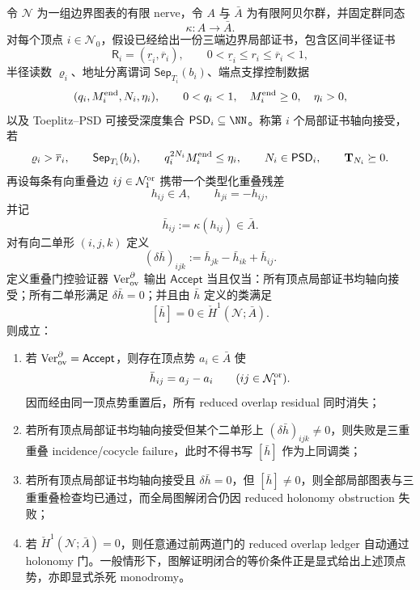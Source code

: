 \begin{proposition}[三端边界证书的重叠账本门控正规形]\label{distill:euclid_elements-diagrammatic_compatibility_audit_families-boundary-overlap-gated-triple-verifier}
令 \(\mathcal N\) 为一组边界图表的有限 nerve，令 \(A\) 与 \(\bar A\) 为有限阿贝尔群，并固定群同态
\[
\kappa:A\longrightarrow \bar A.
\]
对每个顶点 \(i\in\mathcal N_0\)，假设已经给出一份三端边界局部证书，包含区间半径证书
\[
\mathsf R_i=(\underline r_i,\overline r_i),\qquad
0<\underline r_i\le r_i\le\overline r_i<1,
\]
半径读数 \(\varrho_i\)、地址分离谓词 \(\mathsf{Sep}_{T_i}(b_i)\)、端点支撑控制数据
\[
(q_i,M_i^{\rm end},N_i,\eta_i),\qquad 0<q_i<1,\quad M_i^{\rm end}\ge0,\quad \eta_i>0,
\]
以及 Toeplitz--PSD 可接受深度集合 \(\mathsf{PSD}_i\subseteq\NN\)。称第 \(i\) 个局部证书轴向接受，若
\[
\varrho_i>\overline r_i,\qquad
\mathsf{Sep}_{T_i}(b_i),\qquad
q_i^{2N_i}M_i^{\rm end}\le\eta_i,\qquad
N_i\in\mathsf{PSD}_i,\qquad
\mathbf T_{N_i}\succeq0.
\]
再设每条有向重叠边 \(ij\in\mathcal N_1^{\rm or}\) 携带一个类型化重叠残差
\[
h_{ij}\in A,\qquad h_{ji}=-h_{ij},
\]
并记
\[
\bar h_{ij}:=\kappa(h_{ij})\in\bar A.
\]
对有向二单形 \((i,j,k)\) 定义
\[
(\delta\bar h)_{ijk}:=\bar h_{jk}-\bar h_{ik}+\bar h_{ij}.
\]
定义重叠门控验证器 \(\operatorname{Ver}^{\partial}_{\rm ov}\) 输出 \(\mathsf{Accept}\) 当且仅当：所有顶点局部证书均轴向接受；所有二单形满足 \(\delta\bar h=0\)；并且由 \(\bar h\) 定义的类满足
\[
[\bar h]=0\in \check H^1(\mathcal N;\bar A).
\]
则成立：
\begin{enumerate}
  \item 若 \(\operatorname{Ver}^{\partial}_{\rm ov}=\mathsf{Accept}\)，则存在顶点势 \(a_i\in\bar A\) 使
  \[
  \bar h_{ij}=a_j-a_i\qquad(ij\in\mathcal N_1^{\rm or}).
  \]
  因而经由同一顶点势重置后，所有 reduced overlap residual 同时消失；
  \item 若所有顶点局部证书均轴向接受但某个二单形上 \((\delta\bar h)_{ijk}\ne0\)，则失败是三重重叠 incidence/cocycle failure，此时不得书写 \([\bar h]\) 作为上同调类；
  \item 若所有顶点局部证书均轴向接受且 \(\delta\bar h=0\)，但 \([\bar h]\ne0\)，则全部局部图表与三重重叠检查均已通过，而全局图解闭合仍因 reduced holonomy obstruction 失败；
  \item 若 \(\check H^1(\mathcal N;\bar A)=0\)，则任意通过前两道门的 reduced overlap ledger 自动通过 holonomy 门。一般情形下，图解证明闭合的等价条件正是显式给出上述顶点势，亦即显式杀死 monodromy。
\end{enumerate}
\end{proposition}
